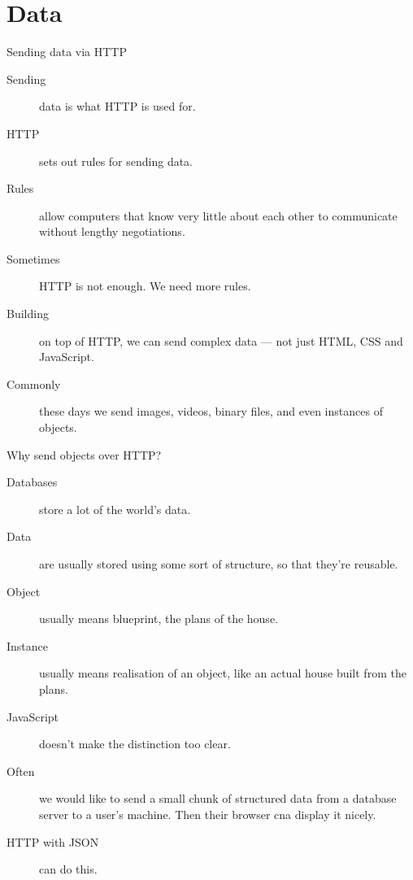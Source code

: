 \section{Data}


\begin{frame}{Sending data via HTTP}
  \begin{description}
    \item[Sending] data is what HTTP is used for.
    \item[HTTP] sets out rules for sending data.
    \item[Rules] allow computers that know very little about each other to communicate without lengthy negotiations.
    \item[Sometimes] HTTP is not enough. We need more rules.
    \item[Building] on top of HTTP, we can send complex data --- not just HTML, CSS and JavaScript.
    \item[Commonly] these days we send images, videos, binary files, and even instances of objects.
  \end{description}
\end{frame}


\begin{frame}{Why send objects over HTTP?}
  \begin{description}
    \item[Databases] store a lot of the world's data.
    \item[Data] are usually stored using some sort of structure, so that they're reusable.
    \item[Object] usually means blueprint, the plans of the house.
    \item[Instance] usually means realisation of an object, like an actual house built from the plans.
    \item[JavaScript] doesn't make the distinction too clear.
    \item[Often] we would like to send a small chunk of structured data from a database server to a user's machine. Then their browser cna display it nicely.
    \item[HTTP with JSON] can do this. 
  \end{description}
\end{frame}


